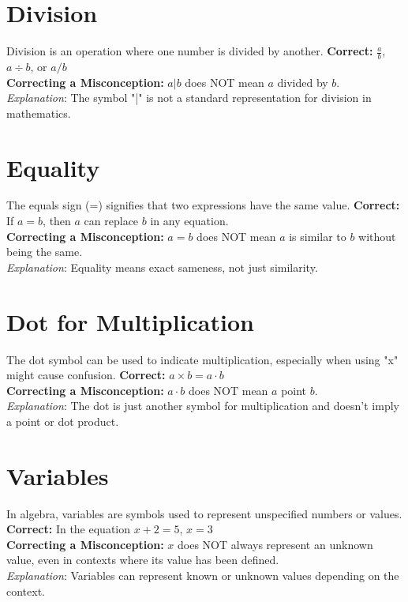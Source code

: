 \documentclass[12pt]{article}
\newenvironment{correct}{\noindent\textbf{Correct:}}{\\}
\newenvironment{misconception}{\noindent\textbf{Correcting a Misconception:}}{\\}
\newenvironment{explanation}{\noindent\textit{Explanation}:}{\\\vspace{1em}}
\begin{document}
\section*{Division}
Division is an operation where one number is divided by another.
\begin{correct} \(\frac{a}{b}\), \(a \div b\), or \(a/b\) \end{correct}
\begin{misconception} \(a|b\) does NOT mean \(a\) divided by \(b\). \end{misconception}
\begin{explanation} The symbol "|" is not a standard representation for division in mathematics. \end{explanation}

\section*{Equality}
The equals sign (=) signifies that two expressions have the same value.
\begin{correct} If \(a = b\), then \(a\) can replace \(b\) in any equation. \end{correct}
\begin{misconception} \(a = b\) does NOT mean \(a\) is similar to \(b\) without being the same. \end{misconception}
\begin{explanation} Equality means exact sameness, not just similarity. \end{explanation}

\section*{Dot for Multiplication}
The dot symbol can be used to indicate multiplication, especially when using "x" might cause confusion.
\begin{correct} \(a \times b = a \cdot b\) \end{correct}
\begin{misconception} \(a \cdot b\) does NOT mean \(a\) point \(b\). \end{misconception}
\begin{explanation} The dot is just another symbol for multiplication and doesn't imply a point or dot product. \end{explanation}

\section*{Variables}
In algebra, variables are symbols used to represent unspecified numbers or values.
\begin{correct} In the equation \(x + 2 = 5\), \(x = 3\) \end{correct}
\begin{misconception} \(x\) does NOT always represent an unknown value, even in contexts where its value has been defined. \end{misconception}
\begin{explanation} Variables can represent known or unknown values depending on the context. \end{explanation}
\end{document}
